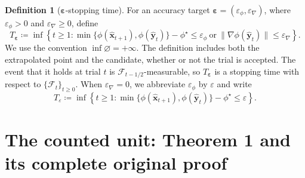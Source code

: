 \documentclass[10pt,a4paper]{amsart}
\theoremstyle{plain}
\theoremstyle{definition}
\newtheorem{definition}[theorem]{Definition}
\theoremstyle{remark}
\begin{document}
\begin{definition}[\(\boldsymbol{\varepsilon}\)-stopping time]
\label{Stopping_time}
For an  accuracy target
\(\boldsymbol{\varepsilon}
=(\varepsilon_\phi,\varepsilon_\nabla)\), where
\(\varepsilon_\phi>0\) and \(\varepsilon_\nabla\ge0\), define
\begin{equation}\label{eq_dfn_stopping_time}
T_{\boldsymbol{\varepsilon}}
\coloneqq 
\inf\left\{
t\ge1:
\min\{\phi(\hat {\bm{x}}_{t+1}),\phi(\hat {\bm{y}}_t)\}-\phi^\star
\le\varepsilon_\phi
\ \text{or}\
\|\nabla\phi(\hat {\bm{y}}_t)\|\le\varepsilon_\nabla
\right\}.
\end{equation}
We use the convention $\inf\varnothing=+\infty$. The definition includes both the extrapolated point and the candidate, whether or not the trial is accepted. The event that it holds at trial $t$ is $\mathcal F_{t-1/2}$-measurable, so $T_{\boldsymbol{\varepsilon}}$ is a stopping time with respect to $\{\mathcal F_t\}_{t\geq0}$. When $\varepsilon_\nabla=0$, we abbreviate $\varepsilon_\phi$ by $\varepsilon$ and write
\[
T_\varepsilon
\coloneqq 
\inf\left\{
t\ge1:
\min\{\phi(\hat {\bm{x}}_{t+1}),\phi(\hat {\bm{y}}_t)\}-\phi^\star
\le\varepsilon
\right\}.
\]
\end{definition}


\section{The counted unit: Theorem 1 and its complete original proof}
\end{document}
